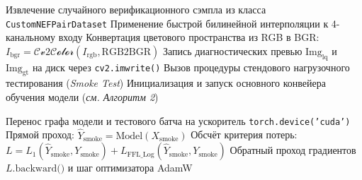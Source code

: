 \documentclass[12pt,a4paper]{article}
\begin{document}
\begin{algorithm}[H]
\BlankLine
{}
Извлечение случайного верификационного сэмпла из класса \texttt{CustomNEFPairDataset}\;
Применение быстрой билинейной интерполяции к 4-канальному входу\;
Конвертация цветового пространства из RGB в BGR: $I_{\text{bgr}} = \mathcal{Cv2Color}(I_{\text{rgb}}, \text{RGB2BGR})$\;
Запись диагностических превью $\text{Img}_{\text{lq}}$ и $\text{Img}_{\text{gt}}$ на диск через \texttt{cv2.imwrite()}\;
\BlankLine
Вызов процедуры стендового нагрузочного тестирования (\textit{Smoke Test})\;
Инициализация и запуск основного конвейера обучения модели (\textit{см. Алгоритм 2})\;
\caption{Верхнеуровневый алгоритм управления сквозным конвейером}
\end{algorithm}

\begin{algorithm}[H]
\DontPrintSemicolon
{}



\BlankLine
{}
Перенос графа модели и тестового батча на ускоритель \texttt{torch.device('cuda')}\;
Прямой проход: $\hat{Y}_{\text{smoke}} = \text{Model}(X_{\text{smoke}})$\;
Обсчёт критерия потерь: $L = L_1(\hat{Y}_{\text{smoke}}, Y_{\text{smoke}}) + L_{\text{FFL\_Log}}(\hat{Y}_{\text{smoke}}, Y_{\text{smoke}})$\;
Обратный проход градиентов $L\text{.backward()}$ и шаг оптимизатора AdamW\;


\end{algorithm}
\end{document}
